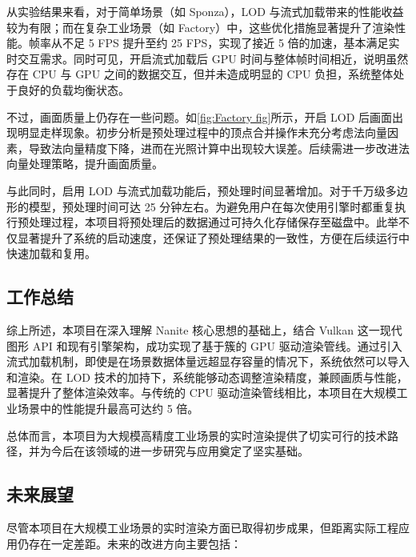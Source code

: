 从实验结果来看，对于简单场景（如 Sponza），LOD 与流式加载带来的性能收益较为有限；而在复杂工业场景（如 Factory）中，这些优化措施显著提升了渲染性能。帧率从不足 5 FPS 提升至约 25 FPS，实现了接近 5 倍的加速，基本满足实时交互需求。同时可见，开启流式加载后 GPU 时间与整体帧时间相近，说明虽然存在 CPU 与 GPU 之间的数据交互，但并未造成明显的 CPU 负担，系统整体处于良好的负载均衡状态。

不过，画面质量上仍存在一些问题。如\autoref{fig:Factory fig}所示，开启 LOD 后画面出现明显走样现象。初步分析是预处理过程中的顶点合并操作未充分考虑法向量因素，导致法向量精度下降，进而在光照计算中出现较大误差。后续需进一步改进法向量处理策略，提升画面质量。

与此同时，启用 LOD 与流式加载功能后，预处理时间显著增加。对于千万级多边形的模型，预处理时间可达 25 分钟左右。为避免用户在每次使用引擎时都重复执行预处理过程，本项目将预处理后的数据通过可持久化存储保存至磁盘中\cite{cereal}。此举不仅显著提升了系统的启动速度，还保证了预处理结果的一致性，方便在后续运行中快速加载和复用。

\subsection{工作总结}

综上所述，本项目在深入理解 Nanite 核心思想的基础上，结合 Vulkan 这一现代图形 API 和现有引擎架构，成功实现了基于簇的 GPU 驱动渲染管线。通过引入流式加载机制，即使是在场景数据体量远超显存容量的情况下，系统依然可以导入和渲染。在 LOD 技术的加持下，系统能够动态调整渲染精度，兼顾画质与性能，显著提升了整体渲染效率。与传统的 CPU 驱动渲染管线相比，本项目在大规模工业场景中的性能提升最高可达约 5 倍。

总体而言，本项目为大规模高精度工业场景的实时渲染提供了切实可行的技术路径，并为今后在该领域的进一步研究与应用奠定了坚实基础。

\subsection{未来展望}

尽管本项目在大规模工业场景的实时渲染方面已取得初步成果，但距离实际工程应用仍存在一定差距。未来的改进方向主要包括：

